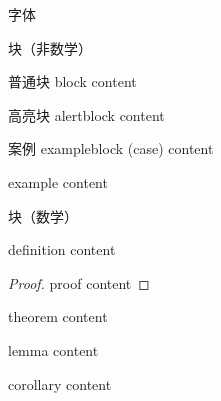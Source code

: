 \begin{frame}{字体}
    \end{frame}

    \begin{frame}{块（非数学）} 
    
        \begin{block}{普通块}
            block content
        \end{block}
        \begin{alertblock}{高亮块}
            alertblock content
        \end{alertblock}
        \begin{exampleblock}{案例}
            exampleblock (case) content
        \end{exampleblock}
        \begin{example}
            example content
        \end{example}
        
    \end{frame}

    \begin{frame}{块（数学）} 
    
        \begin{definition}
            definition content
        \end{definition}
        \begin{proof}
            proof  content
        \end{proof}
        \begin{theorem}
            theorem content
        \end{theorem}
        \begin{lemma}
            lemma content
        \end{lemma}
        \begin{corollary}
            corollary content
        \end{corollary}
        
    \end{frame}